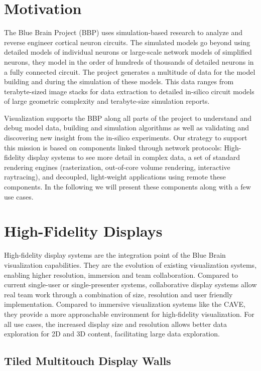 \documentclass[10pt]{llncs}
\begin{document}
\section{Motivation}

The Blue Brain Project (BBP) uses simulation-based research to analyze and reverse
engineer cortical neuron circuits. The simulated models go beyond using detailed
models of individual neurons or large-scale network models of simplified
neurons, they model in the order of hundreds of thousands of detailed neurons in
a fully connected circuit. The project generates a multitude of data for the
model building and during the simulation of these models. This data ranges from
terabyte-sized image stacks for data extraction to detailed in-silico circuit
models of large geometric complexity and terabyte-size simulation reports.

Visualization supports the BBP along all parts of the project to understand and
debug model data, building and simulation algorithms as well as validating and
discovering new insight from the in-silico experiments. Our strategy to support
this mission is based on components linked through network protocols:
High-fidelity display systems to see more detail in complex data, a set of
standard rendering engines (rasterization, out-of-core volume rendering,
interactive raytracing), and decoupled, light-weight applications using remote
these components. In the following we will present these components along with a
few use cases.


\section{High-Fidelity Displays}

High-fidelity display systems are the integration point of the Blue Brain
visualization capabilities. They are the evolution of existing visualization
systems, enabling higher resolution, immersion and team collaboration. Compared
to current single-user or single-presenter systems, collaborative display
systems allow real team work through a combination of size, resolution and user
friendly implementation. Compared to immersive visualization systems like the
CAVE, they provide a more approachable environment for high-fidelity
visualization. For all use cases, the increased display size and resolution
allows better data exploration for 2D and 3D content, facilitating large data
exploration.

\subsection{Tiled Multitouch Display Walls}
\end{document}

